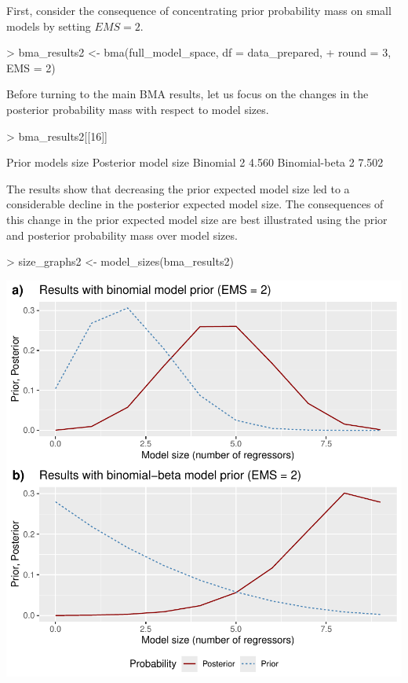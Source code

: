 \documentclass[a4paper]{article}
\begin{document}
First, consider the consequence of concentrating prior probability mass on small models by setting $EMS = 2$.

\begin{Schunk}
\begin{Sinput}
> bma_results2 <- bma(full_model_space, df = data_prepared,
+                     round = 3, EMS = 2)
\end{Sinput}
\end{Schunk}

\noindent Before turning to the main BMA results, let us focus on the changes in the posterior probability mass with respect to model sizes.

\begin{Schunk}
\begin{Sinput}
> bma_results2[[16]]
\end{Sinput}
\begin{Soutput}
              Prior models size Posterior model size
Binomial                      2                4.560
Binomial-beta                 2                7.502
\end{Soutput}
\end{Schunk}

\noindent The results show that decreasing the prior expected model size led to a considerable decline in the posterior expected model size.
The consequences of this change in the prior expected model size are best illustrated using the prior and posterior probability mass over model sizes.

\begin{Schunk}
\begin{Sinput}
> size_graphs2 <- model_sizes(bma_results2)
\end{Sinput}
\end{Schunk}
\includegraphics{bdsm_vignette-028}
\end{document}
